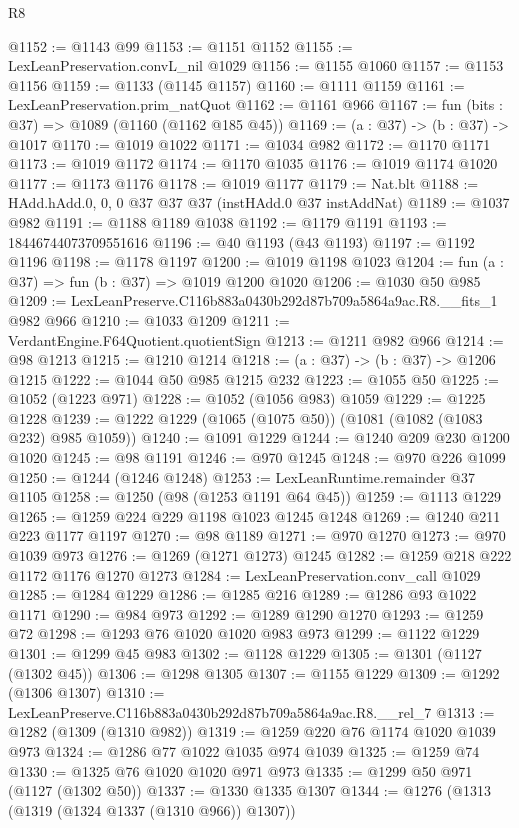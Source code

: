 \begin{lexlean}{R8}
\begin{coremodule}
@1152 := @1143 @99
@1153 := @1151 @1152
@1155 := LexLeanPreservation.convL_nil @1029
@1156 := @1155 @1060
@1157 := @1153 @1156
@1159 := @1133 (@1145 @1157)
@1160 := @1111 @1159
@1161 := LexLeanPreservation.prim_natQuot
@1162 := @1161 @966
@1167 := fun (bits : @37) => @1089 (@1160 (@1162 @185 @45))
@1169 := (a : @37) -> (b : @37) -> @1017
@1170 := @1019 @1022
@1171 := @1034 @982
@1172 := @1170 @1171
@1173 := @1019 @1172
@1174 := @1170 @1035
@1176 := @1019 @1174 @1020
@1177 := @1173 @1176
@1178 := @1019 @1177
@1179 := Nat.blt
@1188 := HAdd.hAdd.{0, 0, 0} @37 @37 @37 (instHAdd.{0} @37 instAddNat)
@1189 := @1037 @982
@1191 := @1188 @1189 @1038
@1192 := @1179 @1191
@1193 := 18446744073709551616
@1196 := @40 @1193 (@43 @1193)
@1197 := @1192 @1196
@1198 := @1178 @1197
@1200 := @1019 @1198 @1023
@1204 := fun (a : @37) => fun (b : @37) => @1019 @1200 @1020
@1206 := @1030 @50 @985
@1209 := LexLeanPreserve.C116b883a0430b292d87b709a5864a9ac.R8.__fits_1 @982 @966
@1210 := @1033 @1209
@1211 := VerdantEngine.F64Quotient.quotientSign
@1213 := @1211 @982 @966
@1214 := @98 @1213
@1215 := @1210 @1214
@1218 := (a : @37) -> (b : @37) -> @1206 @1215
@1222 := @1044 @50 @985 @1215 @232
@1223 := @1055 @50
@1225 := @1052 (@1223 @971)
@1228 := @1052 (@1056 @983) @1059
@1229 := @1225 @1228
@1239 := @1222 @1229 (@1065 (@1075 @50)) (@1081 (@1082 (@1083 @232) @985 @1059))
@1240 := @1091 @1229
@1244 := @1240 @209 @230 @1200 @1020
@1245 := @98 @1191
@1246 := @970 @1245
@1248 := @970 @226 @1099
@1250 := @1244 (@1246 @1248)
@1253 := LexLeanRuntime.remainder @37 @1105
@1258 := @1250 (@98 (@1253 @1191 @64 @45))
@1259 := @1113 @1229
@1265 := @1259 @224 @229 @1198 @1023 @1245 @1248
@1269 := @1240 @211 @223 @1177 @1197
@1270 := @98 @1189
@1271 := @970 @1270
@1273 := @970 @1039 @973
@1276 := @1269 (@1271 @1273) @1245
@1282 := @1259 @218 @222 @1172 @1176 @1270 @1273
@1284 := LexLeanPreservation.conv_call @1029
@1285 := @1284 @1229
@1286 := @1285 @216
@1289 := @1286 @93 @1022 @1171
@1290 := @984 @973
@1292 := @1289 @1290 @1270
@1293 := @1259 @72
@1298 := @1293 @76 @1020 @1020 @983 @973
@1299 := @1122 @1229
@1301 := @1299 @45 @983
@1302 := @1128 @1229
@1305 := @1301 (@1127 (@1302 @45))
@1306 := @1298 @1305
@1307 := @1155 @1229
@1309 := @1292 (@1306 @1307)
@1310 := LexLeanPreserve.C116b883a0430b292d87b709a5864a9ac.R8.__rel_7
@1313 := @1282 (@1309 (@1310 @982))
@1319 := @1259 @220 @76 @1174 @1020 @1039 @973
@1324 := @1286 @77 @1022 @1035 @974 @1039
@1325 := @1259 @74
@1330 := @1325 @76 @1020 @1020 @971 @973
@1335 := @1299 @50 @971 (@1127 (@1302 @50))
@1337 := @1330 @1335 @1307
@1344 := @1276 (@1313 (@1319 (@1324 @1337 (@1310 @966)) @1307))

\end{coremodule}
\end{lexlean}
